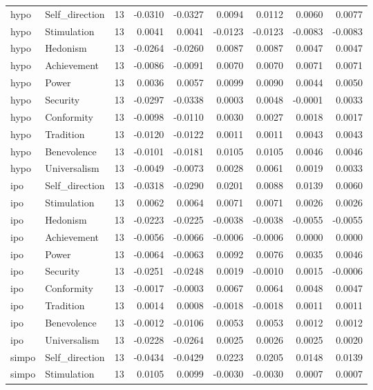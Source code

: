 \begin{tabular}{llrrrrrrr}
hypo & Self\_direction & 13 & -0.0310 & -0.0327 & 0.0094 & 0.0112 & 0.0060 & 0.0077 \\
hypo & Stimulation & 13 & 0.0041 & 0.0041 & -0.0123 & -0.0123 & -0.0083 & -0.0083 \\
hypo & Hedonism & 13 & -0.0264 & -0.0260 & 0.0087 & 0.0087 & 0.0047 & 0.0047 \\
hypo & Achievement & 13 & -0.0086 & -0.0091 & 0.0070 & 0.0070 & 0.0071 & 0.0071 \\
hypo & Power & 13 & 0.0036 & 0.0057 & 0.0099 & 0.0090 & 0.0044 & 0.0050 \\
hypo & Security & 13 & -0.0297 & -0.0338 & 0.0003 & 0.0048 & -0.0001 & 0.0033 \\
hypo & Conformity & 13 & -0.0098 & -0.0110 & 0.0030 & 0.0027 & 0.0018 & 0.0017 \\
hypo & Tradition & 13 & -0.0120 & -0.0122 & 0.0011 & 0.0011 & 0.0043 & 0.0043 \\
hypo & Benevolence & 13 & -0.0101 & -0.0181 & 0.0105 & 0.0105 & 0.0046 & 0.0046 \\
hypo & Universalism & 13 & -0.0049 & -0.0073 & 0.0028 & 0.0061 & 0.0019 & 0.0033 \\
ipo & Self\_direction & 13 & -0.0318 & -0.0290 & 0.0201 & 0.0088 & 0.0139 & 0.0060 \\
ipo & Stimulation & 13 & 0.0062 & 0.0064 & 0.0071 & 0.0071 & 0.0026 & 0.0026 \\
ipo & Hedonism & 13 & -0.0223 & -0.0225 & -0.0038 & -0.0038 & -0.0055 & -0.0055 \\
ipo & Achievement & 13 & -0.0056 & -0.0066 & -0.0006 & -0.0006 & 0.0000 & 0.0000 \\
ipo & Power & 13 & -0.0064 & -0.0063 & 0.0092 & 0.0076 & 0.0035 & 0.0046 \\
ipo & Security & 13 & -0.0251 & -0.0248 & 0.0019 & -0.0010 & 0.0015 & -0.0006 \\
ipo & Conformity & 13 & -0.0017 & -0.0003 & 0.0067 & 0.0064 & 0.0048 & 0.0047 \\
ipo & Tradition & 13 & 0.0014 & 0.0008 & -0.0018 & -0.0018 & 0.0011 & 0.0011 \\
ipo & Benevolence & 13 & -0.0012 & -0.0106 & 0.0053 & 0.0053 & 0.0012 & 0.0012 \\
ipo & Universalism & 13 & -0.0228 & -0.0264 & 0.0025 & 0.0026 & 0.0025 & 0.0020 \\
simpo & Self\_direction & 13 & -0.0434 & -0.0429 & 0.0223 & 0.0205 & 0.0148 & 0.0139 \\
simpo & Stimulation & 13 & 0.0105 & 0.0099 & -0.0030 & -0.0030 & 0.0007 & 0.0007 \\

\end{tabular}
